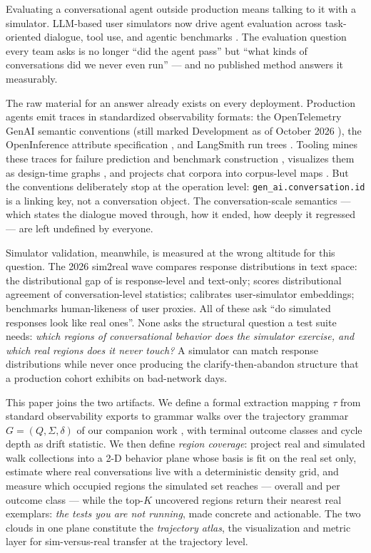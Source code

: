 Evaluating a conversational agent outside production means talking to it with a simulator.
LLM-based user simulators now drive agent evaluation across task-oriented dialogue, tool use,
and agentic benchmarks \citep{sim2realAgentic2026,realUserSim2026,sierra2024taubench}.
The evaluation question every team asks is no longer ``did the agent pass'' but
``what kinds of conversations did we never even run'' ---
and no published method answers it measurably.

The raw material for an answer already exists on every deployment.
Production agents emit traces in standardized observability formats: the OpenTelemetry GenAI
semantic conventions (still marked Development as of October 2026 \citep{otelgenai2026}), the
OpenInference attribute specification \citep{openinference2026}, and LangSmith run trees
\citep{langsmith2026}.
Tooling mines these traces for failure prediction and benchmark construction
\citep{automataTraces2026,tracedance2026}, visualizes them as design-time graphs
\citep{graphoftrace2026}, and projects chat corpora into corpus-level maps
\citep{wildvis2024}.
But the conventions deliberately stop at the operation level: \texttt{gen\_ai.conversation.id}
is a linking key, not a conversation object.
The conversation-scale semantics --- which states the dialogue moved through, how it ended,
how deeply it regressed --- are left undefined by everyone.

Simulator validation, meanwhile, is measured at the wrong altitude for this question.
The 2026 sim2real wave compares response distributions in text space:
the distributional gap of \citet{distributionalGap2026} is response-level and text-only;
\citet{cds2026} scores distributional agreement of conversation-level statistics;
\citet{cue2026} calibrates user-simulator embeddings;
\citet{mirrorbench2026} benchmarks human-likeness of user proxies.
All of these ask ``do simulated responses look like real ones''.
None asks the structural question a test suite needs: \emph{which regions of conversational
behavior does the simulator exercise, and which real regions does it never touch?}
A simulator can match response distributions while never once producing the
clarify-then-abandon structure that a production cohort exhibits on bad-network days.

This paper joins the two artifacts.
We define a formal extraction mapping $\tau$ from standard observability exports to grammar
walks over the trajectory grammar $G=(Q,\Sigma,\delta)$ of our companion work
\citep{garcia2026grammar}, with terminal outcome classes and cycle depth as drift statistic.
We then define \emph{region coverage}: project real and simulated walk collections into a
2-D behavior plane whose basis is fit on the real set only, estimate where real conversations
live with a deterministic density grid, and measure which occupied regions the simulated set
reaches --- overall and per outcome class --- while the top-$K$ uncovered regions return their
nearest real exemplars: \emph{the tests you are not running}, made concrete and actionable.
The two clouds in one plane constitute the \emph{trajectory atlas}, the visualization and
metric layer for sim-versus-real transfer at the trajectory level.

